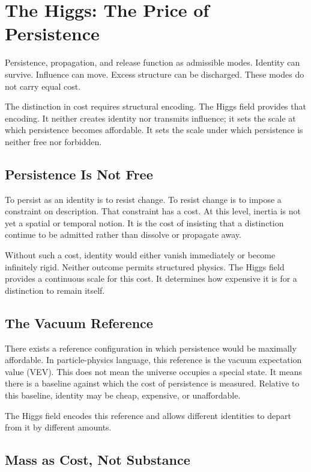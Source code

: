 \documentclass[11pt,twoside,openright]{book}
\begin{document}
\chapter{The Higgs: The Price of Persistence}

Persistence, propagation, and release function as admissible modes. Identity can survive. Influence can move. Excess structure can be discharged. These modes do not carry equal cost.

The distinction in cost requires structural encoding. The Higgs field provides that encoding. It neither creates identity nor transmits influence; it sets the scale at which persistence becomes affordable. It sets the scale under which persistence is neither free nor forbidden.

\section*{Persistence Is Not Free}

To persist as an identity is to resist change. To resist change is to impose a constraint on description. That constraint has a cost. At this level, inertia is not yet a spatial or temporal notion. It is the cost of insisting that a distinction continue to be admitted rather than dissolve or propagate away.

Without such a cost, identity would either vanish immediately or become infinitely rigid. Neither outcome permits structured physics. The Higgs field provides a continuous scale for this cost. It determines how expensive it is for a distinction to remain itself.

\section*{The Vacuum Reference}

There exists a reference configuration in which persistence would be maximally affordable. In particle-physics language, this reference is the vacuum expectation value (VEV). This does not mean the universe occupies a special state. It means there is a baseline against which the cost of persistence is measured. Relative to this baseline, identity may be cheap, expensive, or unaffordable.

The Higgs field encodes this reference and allows different identities to depart from it by different amounts.

\section*{Mass as Cost, Not Substance}
\end{document}
